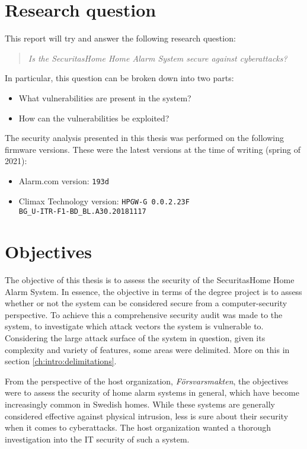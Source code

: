 \section{Research question} \label{ch:intro:research-question}
This report will try and answer the following research question:

\begin{quote}
    \textit{Is the SecuritasHome Home Alarm System secure against cyberattacks?}
\end{quote}

In particular, this question can be broken down into two parts:

\begin{itemize}
    \item What vulnerabilities are present in the system?
    \item How can the vulnerabilities be exploited?
\end{itemize}

The security analysis presented in this thesis was performed on the following firmware versions. These were the latest versions at the time of writing (spring of 2021):
\begin{itemize}
    \item Alarm.com version: \texttt{193d}
    \item Climax Technology version: \texttt{HPGW-G 0.0.2.23F\\ BG\_U-ITR-F1-BD\_BL.A30.20181117}
\end{itemize}

\section{Objectives} \label{ch:intro:objectives}
The objective of this thesis is to assess the security of the SecuritasHome Home Alarm System. In essence, the objective in terms of the degree project is to assess whether or not the system can be considered secure from a computer-security perspective. To achieve this a comprehensive security audit was made to the system, to investigate which attack vectors the system is vulnerable to. Considering the large attack surface of the system in question, given its complexity and variety of features, some areas were delimited. More on this in section \ref{ch:intro:delimitations}.

From the perspective of the host organization, \textit{Försvarsmakten}, the objectives were to assess the security of home alarm systems in general, which have become increasingly common in Swedish homes. While these systems are generally considered effective against physical intrusion, less is sure about their security when it comes to cyberattacks. The host organization wanted a thorough investigation into the IT security of such a system.

